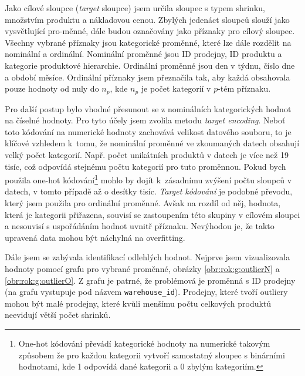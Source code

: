 Jako cílové sloupce (\emph{target} sloupce) jsem určila sloupec s typem shrinku, množstvím produktu a nákladovou cenou. Zbylých jedenáct sloupců slouží jako vysvětlující pro-\linebreak měnné, dále budou označovány jako příznaky pro cílový sloupec. Všechny vybrané příznaky jsou kategorické proměnné, které lze dále rozdělit na nominální a ordinální. Nominální proměnné jsou ID prodejny, ID produktu a kategorie produktové hierarchie. Ordinální proměnné jsou den v týdnu, číslo dne a období měsíce. Ordinální příznaky jsem přeznačila tak, aby každá obsahovala pouze hodnoty od nuly do $n_p$, kde $n_p$ je počet kategorií v $p$-tém příznaku. 

Pro další postup bylo vhodné přesunout se z nominálních kategorických hodnot na číselné hodnoty. Pro tyto účely jsem zvolila metodu \emph{target encoding}.  %
Neboť toto kódování na numerické hodnoty zachovává velikost datového souboru, to je klíčové vzhledem k~tomu, že nominální proměnné ve zkoumaných datech obsahují velký počet kategorií. 
Např. počet unikátních produktů v datech je více než 19 tisíc, což odpovídá stejnému počtu kategorií pro tuto proměnnou. Pokud bych použila one-hot kódování\footnote{One-hot kódování převádí kategorické hodnoty na numerické takovým způsobem že pro každou kategorii vytvoří samostatný sloupec s binárními hodnotami, kde 1 odpovídá dané kategorii a 0 zbylým kategoriím.}  mohlo by dojít k~zásadnímu zvýšení počtu sloupců v datech, v tomto případě až o desítky tisíc. \emph{Target kódování} je podobné převodu, který jsem použila pro ordinální proměnné. Avšak na rozdíl od něj, hodnota, která je kategorii přiřazena, souvisí se zastoupením této skupiny v cílovém sloupci a nesouvisí s uspořádáním hodnot uvnitř příznaku. Nevýhodou je, že takto upravená data mohou být náchylná na overfitting. 


Dále jsem se zabývala identifikací odlehlých hodnot. Nejprve jsem vizualizovala hodnoty pomocí grafu pro vybrané proměnné, obrázky \ref*{obr:rok:g:outlierN} a \ref*{obr:rok:g:outlierO}. Z grafu je patrné, že problémová je proměnná s ID prodejny (na grafu vystupuje pod názvem \texttt{warehouse\_id}). Prodejny, které tvoří outliery mohou být malé prodejny, které kvůli menšímu počtu celkových produktů neevidují větší počet shrinků. %


